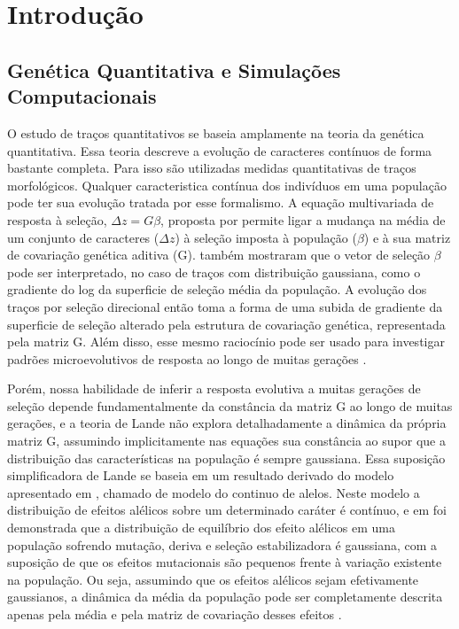 \cleardoublepage
\pagestyle{fancy}

\chapter{Introdução}\label{intro}
\section{Genética Quantitativa e Simulações Computacionais}\label{intro:historico}

O estudo de traços quantitativos se baseia amplamente na teoria da
genética quantitativa. 
Essa teoria descreve a evolução de caracteres contínuos de forma
bastante completa. 
Para isso são utilizadas medidas quantitativas de traços
morfológicos. 
Qualquer caracteristica contínua dos indivíduos em uma população pode
ter sua evolução tratada por esse formalismo. 
A equação multivariada de resposta à seleção, $\Delta z = G \beta$,
proposta por \cite{Lande1979} permite ligar a mudança na média de um
conjunto de caracteres ($\Delta z$) à seleção imposta à população
($\beta$) e à sua matriz de covariação genética aditiva (G). 
\cite{Lande1983} também mostraram que o vetor de seleção $\beta$
pode ser interpretado, no caso de traços com distribuição gaussiana,
como o gradiente do log da superficie de seleção média da população. 
A evolução dos traços por seleção direcional então toma a forma de uma
subida de gradiente da superficie de seleção alterado pela estrutura de
covariação genética, representada pela matriz G.
Além disso, esse mesmo raciocínio pode ser usado para investigar padrões
microevolutivos de resposta ao longo de muitas gerações
\citep{Lande1983, Marroig2004, Marroig2005}. 

Porém, nossa habilidade de inferir a resposta evolutiva a muitas
gerações de seleção depende fundamentalmente da constância da matriz G
ao longo de muitas gerações, e a teoria de Lande não explora
detalhadamente a dinâmica da própria matriz G, assumindo implicitamente
nas equações sua constância ao supor que a distribuição das
características na população é sempre gaussiana. 
Essa suposição simplificadora de Lande se baseia em um resultado
derivado do modelo apresentado em \cite{Crow1964}, chamado de modelo do
continuo de alelos. 
Neste modelo a distribuição de efeitos alélicos sobre um determinado
caráter é contínuo, e em \cite{Kimura1965} foi demonstrada que a
distribuição de equilíbrio dos efeito alélicos em uma população sofrendo
mutação, deriva e seleção estabilizadora é gaussiana, com a suposição de
que os efeitos mutacionais são pequenos frente à variação existente na
população. 
Ou seja, assumindo que os efeitos alélicos sejam efetivamente
gaussianos, a dinâmica da média da população pode ser completamente
descrita apenas pela média e pela matriz de covariação desses efeitos
\citep{Barton1987}. 

